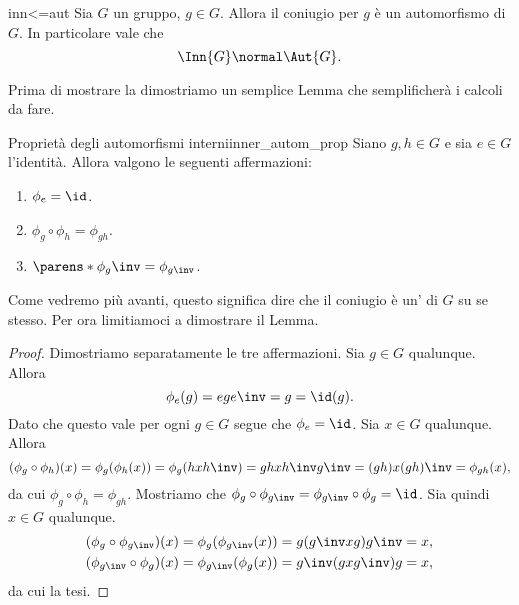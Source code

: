 \begin{proposition}{}{inn<=aut}
    Sia $G$ un gruppo, $g \in G$. Allora il coniugio per $g$ è un automorfismo di $G$.
    In particolare vale che \[
        \Inn{G} \normal \Aut{G}. 
    \] 
\end{proposition}

Prima di mostrare la  dimostriamo un semplice Lemma che semplificherà i calcoli da fare.

\begin{lemma}
    {Proprietà degli automorfismi interni}{inner_autom_prop}
    Siano $g, h \in G$ e sia $e \in G$ l'identità. Allora valgono le seguenti affermazioni:
    \begin{enumerate}[(1)]
        \item $\phi_e = \id$.
        \item $\phi_g \circ \phi_h = \phi_{gh}$.
        \item $\parens*{\phi_g}\inv = \phi_{g\inv}$.
    \end{enumerate}
\end{lemma}
Come vedremo più avanti, questo significa dire che il coniugio è un' di $G$ su se stesso. Per ora limitiamoci a dimostrare il Lemma.
\begin{proof}
    Dimostriamo separatamente le tre affermazioni.
     Sia $g \in G$ qualunque. Allora \[
        \phi_e(g) = ege\inv = g = \id(g).
    \] Dato che questo vale per ogni $g \in G$ segue che $\phi_e = \id$.
     Sia $x \in G$ qualunque. Allora \[
        (\phi_g \circ \phi_h)(x) = \phi_g(\phi_h(x)) = \phi_g(hxh\inv) = ghxh\inv g\inv = (gh)x(gh)\inv = \phi_{gh}(x),
    \] da cui $\phi_g \circ \phi_h = \phi_{gh}$.
     Mostriamo che $\phi_g \circ \phi_{g\inv} = \phi_{g\inv} \circ \phi_g = \id$. Sia quindi $x \in G$ qualunque. \begin{gather*}
        (\phi_g \circ \phi_{g\inv})(x) = \phi_g(\phi_{g\inv}(x)) = g(g\inv xg)g\inv = x, \\
        (\phi_{g\inv} \circ \phi_{g})(x) = \phi_{g\inv}(\phi_{g}(x)) = g\inv(gxg\inv)g = x,
    \end{gather*} da cui la tesi.
\end{proof}

